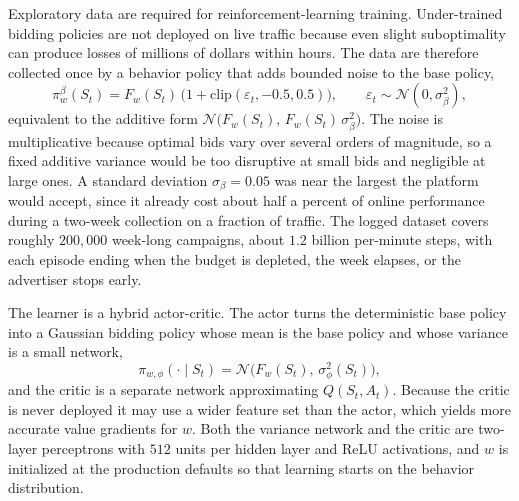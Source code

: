 Exploratory data are required for reinforcement-learning training. Under-trained bidding policies are not deployed on live traffic because even slight suboptimality can produce losses of millions of dollars within hours. The data are therefore collected once by a behavior policy that adds bounded noise to the base policy,
\begin{equation}
\pi^\beta_w(S_t)=F_w(S_t)\,\big(1+\mathrm{clip}(\varepsilon_t,-0.5,0.5)\big),\qquad \varepsilon_t\sim\mathcal{N}(0,\sigma_\beta^2),
\end{equation}
equivalent to the additive form $\mathcal{N}\big(F_w(S_t),\,F_w(S_t)\,\sigma_\beta^2\big)$. The noise is multiplicative because optimal bids vary over several orders of magnitude, so a fixed additive variance would be too disruptive at small bids and negligible at large ones. A standard deviation $\sigma_\beta=0.05$ was near the largest the platform would accept, since it already cost about half a percent of online performance during a two-week collection on a fraction of traffic. The logged dataset covers roughly $200{,}000$ week-long campaigns, about $1.2$ billion per-minute steps, with each episode ending when the budget is depleted, the week elapses, or the advertiser stops early.

The learner is a hybrid actor-critic. The actor turns the deterministic base policy into a Gaussian bidding policy whose mean is the base policy and whose variance is a small network,
\begin{equation}
\pi_{w,\phi}(\cdot\mid S_t)=\mathcal{N}\big(F_w(S_t),\,\sigma_\phi^2(S_t)\big),
\end{equation}
and the critic is a separate network approximating $Q(S_t,A_t)$. Because the critic is never deployed it may use a wider feature set than the actor, which yields more accurate value gradients for $w$. Both the variance network and the critic are two-layer perceptrons with $512$ units per hidden layer and ReLU activations, and $w$ is initialized at the production defaults so that learning starts on the behavior distribution.

